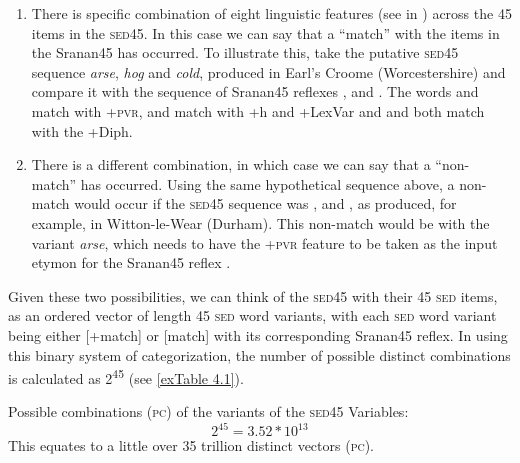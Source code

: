 \begin{enumerate}
\item{There is specific combination of eight linguistic features (see  in ) across the 45 items in the \textsc{sed45}. In this case we can say that a ``match'' with the items in the Sranan45 has occurred. To illustrate this, take the putative \textsc{sed45} sequence \textipa{[ars]} \emph{arse}, \textipa{[h6g]} \emph{hog} and \textipa{[k@Uld]} \emph{cold}, produced in Earl's Croome (Worcestershire) and compare it with the sequence of Sranan45  reflexes \textipa{[ras]}, \textipa{[hagu]} and \textipa{[kouru]}. The words \textipa{[ars]} and \textipa{[ras]} match with +\textsc{pvr}, \textipa{[h6g]} and \textipa{[hagu]} match with +h and +LexVar and \textipa{[k@Uld]} and \textipa{[kouru]} both match with the +Diph.}
\item{There is a different combination, in which case we can say that a ``non-match'' has occurred. Using the same hypothetical sequence above, a non-match would occur if the \textsc{sed45}  sequence was \textipa{[a:s]}, \textipa{[h6g]} and \textipa{[k@Uld]}, as produced, for example, in Witton-le-Wear (Durham). This non-match would be with the variant \textipa{[a:s]} \emph{arse}, which needs to have the +\textsc{pvr} feature to be taken as the input etymon for the Sranan45  reflex \textipa{[ras]}.}
\end{enumerate}

Given these two possibilities, we can think of the \textsc{sed45} with their 45 \textsc{sed} items, as an ordered vector of length 45 \textsc{sed} word variants, with each \textsc{sed} word variant being either [+match] or [\textminus{}match] with its corresponding Sranan45 reflex. In using this binary system of categorization, the number of possible distinct combinations is calculated as 2\textsuperscript{45} (see \ref{exTable 4.1}).

\ea
\label{exTable 4.1}
{Possible combinations (\textsc{pc}) of the variants of the \textsc{sed45} Variables}:\\
\[2^{45} = 3.52 \ast 10^{13}\]
This equates to a little over 35 trillion distinct vectors (\textsc{pc}). \\  
\z

